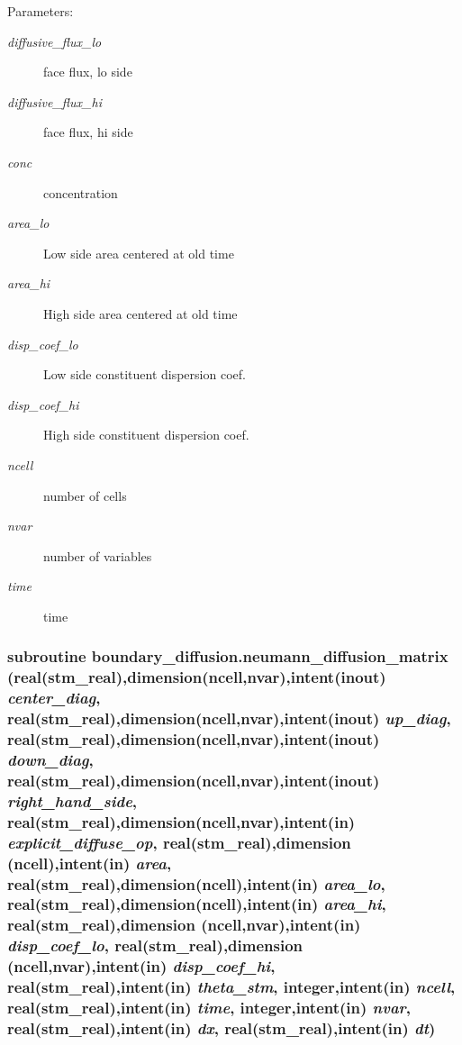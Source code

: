 \begin{Desc}
\item[Parameters:]
\begin{description}
\item[{\em diffusive\_\-flux\_\-lo}]face flux, lo side\item[{\em diffusive\_\-flux\_\-hi}]face flux, hi side\item[{\em conc}]concentration \item[{\em area\_\-lo}]Low side area centered at old time\item[{\em area\_\-hi}]High side area centered at old time\item[{\em disp\_\-coef\_\-lo}]Low side constituent dispersion coef.\item[{\em disp\_\-coef\_\-hi}]High side constituent dispersion coef.\item[{\em ncell}]number of cells\item[{\em nvar}]number of variables\item[{\em time}]time \end{description}
\end{Desc}
\hypertarget{a00054_3bf42416cc949b15affaa511e12c323c}{
\subsubsection[{neumann\_\-diffusion\_\-matrix}]{\setlength{\rightskip}{0pt plus 5cm}subroutine boundary\_\-diffusion.neumann\_\-diffusion\_\-matrix (real(stm\_\-real),dimension(ncell,nvar),intent(inout) {\em center\_\-diag}, \/  real(stm\_\-real),dimension(ncell,nvar),intent(inout) {\em up\_\-diag}, \/  real(stm\_\-real),dimension(ncell,nvar),intent(inout) {\em down\_\-diag}, \/  real(stm\_\-real),dimension(ncell,nvar),intent(inout) {\em right\_\-hand\_\-side}, \/  real(stm\_\-real),dimension(ncell,nvar),intent(in) {\em explicit\_\-diffuse\_\-op}, \/  real(stm\_\-real),dimension (ncell),intent(in) {\em area}, \/  real(stm\_\-real),dimension(ncell),intent(in) {\em area\_\-lo}, \/  real(stm\_\-real),dimension(ncell),intent(in) {\em area\_\-hi}, \/  real(stm\_\-real),dimension (ncell,nvar),intent(in) {\em disp\_\-coef\_\-lo}, \/  real(stm\_\-real),dimension (ncell,nvar),intent(in) {\em disp\_\-coef\_\-hi}, \/  real(stm\_\-real),intent(in) {\em theta\_\-stm}, \/  integer,intent(in) {\em ncell}, \/  real(stm\_\-real),intent(in) {\em time}, \/  integer,intent(in) {\em nvar}, \/  real(stm\_\-real),intent(in) {\em dx}, \/  real(stm\_\-real),intent(in) {\em dt})}}
\label{a00054_3bf42416cc949b15affaa511e12c323c}


